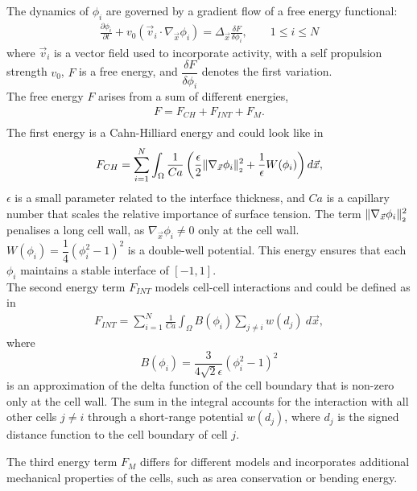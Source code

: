 The dynamics of $\phi_i$ are governed by a gradient flow of a free energy functional:
\begin{align*}
	\frac{\partial \phi_i}{\partial t} + v_0 (\vec{v}_i \cdot \nabla_{\vec{x}} \phi_i) = \Delta_{\vec{x}} \frac{\delta F}{\delta \phi_i}, \qquad 1 \leq i \leq N 
\end{align*}
where $\vec{v}_i$ is a vector field used to incorporate activity, with a self propulsion strength $v_0$, $F$ is a free energy, and $\dfrac{\delta F}{\delta \phi_i}$ denotes the first variation.\\
The free energy $F$ arises from a sum of different energies, 
\begin{align*}
	F = F_{CH} + F_{INT} + F_{M}. \\
\end{align*}
The first energy is a Cahn-Hilliard energy and could look like in~\cite{wenzel2021}
\begin{align*} 
	F_{CH} = \sum\limits_{i=1}^N \int_{\Omega} \dfrac{1}{Ca} \left( \dfrac{\epsilon}{2} \norm[\nabla_{\vec{x}} \phi_i]^2 + \dfrac{1}{\epsilon} W(\phi_i) \right) d\vec{x},
\end{align*}
$\epsilon$ is a small parameter related to the interface thickness, and $Ca$ is a capillary number that scales the relative importance of surface tension.
The term $\norm[\nabla_{\vec{x}} \phi_i]^2$ penalises a long cell wall, as $\nabla_{\vec{x}} \phi_i \neq 0$ only at the cell wall.
$W(\phi_i) = \dfrac{1}{4} (\phi_i^2 - 1)^2$ is a double-well potential. 
This energy ensures that each $\phi_i$ maintains a stable interface of $[-1,1]$.  \\ 
The second energy term $F_{INT}$ models cell-cell interactions and could be defined as in~\cite{wenzel2021}
\begin{align*}
	F_{INT} = \sum\limits_{i=1}^N \frac{1}{Ca} \int_{\Omega} B(\phi_i) \sum\limits_{j \neq i} w(d_j) \: d\vec{x},
\end{align*}
where 
\[B(\phi_i) = \dfrac{3}{4\sqrt{2}\epsilon} (\phi_i^2 - 1)^2\]
is an approximation of the delta function of the cell boundary that is non-zero only at the cell wall.
The sum in the integral accounts for the interaction with all other cells $j \neq i$ through a short-range potential $w(d_j)$, where $d_j$ is the signed distance function to the cell boundary of cell $j$.  

The third energy term $F_M$ differs for different models and incorporates additional mechanical properties of the cells, such as area conservation or bending energy.%

